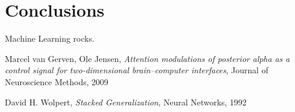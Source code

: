 \documentclass[10pt]{article}
\begin{document}
\section{Conclusions}
Machine Learning rocks.

\begin{thebibliography}{9}

Marcel van Gerven, Ole Jensen,
\emph{Attention modulations of posterior alpha as a control signal for two-dimensional brain–computer interfaces},
Journal of Neuroscience Methods, 2009

David H. Wolpert,
\emph{Stacked Generalization},
Neural Networks, 1992

\end{thebibliography}
\end{document}
